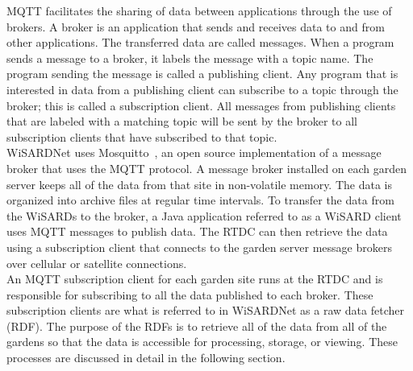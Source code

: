 MQTT facilitates the sharing of data between applications through the use of brokers. A broker is an application that sends and receives data to and from other applications. The transferred data are called messages. When a program sends a message to a broker, it labels the message with a topic name. The program sending the message is called a publishing client. Any program that is interested in data from a publishing client can subscribe to a topic through the broker; this is called a subscription client. All messages from publishing clients that are labeled with a matching topic will be sent by the broker to all subscription clients that have subscribed to that topic.\\

WiSARDNet uses Mosquitto~\cite{mosquitto}, an open source implementation of a message broker that uses the MQTT protocol. A message broker installed on each garden server keeps all of the data from that site in non-volatile memory. The data is organized into archive files at regular time intervals. To transfer the data from the WiSARDs to the broker, a Java application referred to as a WiSARD client uses MQTT messages to publish data. The RTDC can then retrieve the data using a subscription client that connects to the garden server message brokers over cellular or satellite connections.\\

An MQTT subscription client for each garden site runs at the RTDC and is responsible for subscribing to all the data published to each broker. These subscription clients are what is referred to in WiSARDNet as a raw data fetcher (RDF).  The purpose of the RDFs is to retrieve all of the data from all of the gardens so that the data is accessible for processing, storage, or viewing. These processes are discussed in detail in the following section.\\

